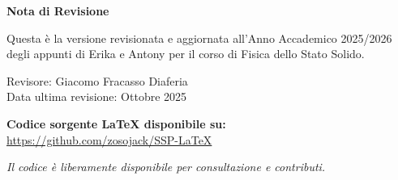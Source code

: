 \thispagestyle{empty}
\vspace*{\fill}
\begin{center}
    \large
    \textbf{Nota di Revisione}
    
    \vspace{1cm}

    Questa è la versione revisionata e aggiornata all'Anno Accademico 2025/2026\\
    degli appunti di Erika e Antony per il corso di Fisica dello Stato Solido.

    \vspace{0.5cm}
    
    Revisore: Giacomo Fracasso Diaferia \\
    Data ultima revisione: Ottobre 2025
    
    \vspace{1cm}
    
    \textbf{Codice sorgente LaTeX disponibile su:} \\
    \url{https://github.com/zosojack/SSP-LaTeX}
    
    \vspace{0.3cm}
    
    \small
    \textit{Il codice è liberamente disponibile per consultazione e contributi.}
\end{center}
\vspace*{\fill}
\clearpage